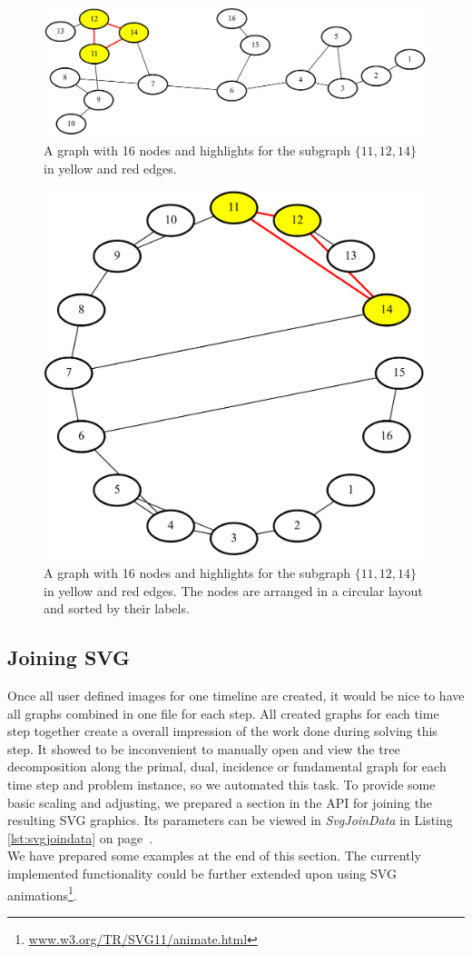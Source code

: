 \documentclass[a4paper, 12pt, bibliography=totoc]{scrartcl}
\begin{document}
\begin{figure}[H]
	\includegraphics[width=\linewidth]{images/minvc16graph9.png}
	\caption{A graph with 16 nodes and highlights for the subgraph $\{11,12,14\}$ in yellow and red edges.}
	\label{fig:minvc16graph9}
\end{figure}

\begin{figure}[H]
	\centering
	\includegraphics[width=0.6\linewidth]{images/minvc16graph9sorted.png}
	\caption{A graph with 16 nodes and highlights for the subgraph $\{11,12,14\}$ in yellow and red edges. The nodes are arranged in a circular layout and sorted by their labels.}
	\label{fig:minvc16graph9sorted}
\end{figure}

\subsection{Joining SVG}\label{sec:svgjoin}
Once all user defined images for one timeline are created, it would be nice to have all graphs combined in one file for each step. All created graphs for each time step together create a overall impression of the work done during solving this step. It showed to be inconvenient to manually open and view the tree decomposition along the primal, dual, incidence or fundamental graph for each time step and problem instance, so we automated this task.
 To provide some basic scaling and adjusting, we prepared a section in the API for joining the resulting SVG graphics.
Its parameters can be viewed in \textit{SvgJoinData} in Listing \ref{lst:svgjoindata} on page~\pageref{lst:svgjoindata}. \\
We have prepared some examples at the end of this section.
The currently implemented functionality could be further extended upon using SVG animations\footnote{\url{www.w3.org/TR/SVG11/animate.html}}.\\
\end{document}

